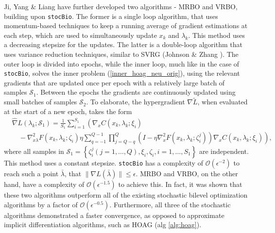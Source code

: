\documentclass[11pt, twoside]{report}
\begin{document}
Ji, Yang \& Liang have further developed two algorithms - MRBO and VRBO, building upon \texttt{stocBio}\cite{yang2021provably}. The former is a single loop algorithm, that uses momentum-based techniques to keep a running average of gradient estimations at each step, which are used to simultaneously update $x_k$ and $\lambda_k$. This method uses a decreasing stepsize for the updates. The latter is a double-loop algorithm that uses variance reduction techniques, similar to SVRG (Johnson \& Zhang \cite{johnson2013accelerating}). The outer loop is divided into epochs, while the inner loop, much like in the case of \texttt{stocBio}, solves the inner problem (\ref{inner_hoag_neu_orig}), using the relevant gradients that are updated once per epoch with a relatively large batch of samples $\mathcal{S}_1$. Between the epochs the gradients are continuously updated using small batches of samples $\mathcal{S}_2$. To elaborate, the hypergradient $\nabla \tilde{L}$, when evaluated at the start of a new epoch, takes the form
\begin{equation} \label{VRBO_hyper}
    \begin{aligned}
&\widehat{\nabla} L\left(\lambda_k ; \mathcal{S}_1\right)=\frac{1}{S_1} \sum_{i=1}^{S_1}\left(\nabla_x C\left(x_k, \lambda_k ; \xi_i\right)\right. \\
&\left.\quad-\nabla_{x \lambda}^2 F\left(x_k, \lambda_k ; \zeta_i\right) \eta \sum_{q=-1}^{Q-1} \prod_{j=Q-q}^Q\left(I-\eta \nabla_x^2 F\left(x_k, \lambda_k ; \zeta_i^j\right)\right) \nabla_x C\left(x_k, \lambda_k ; \xi_i\right)\right),
\end{aligned}
\end{equation}
where all samples in $\mathcal{S}_1 = \left\{\zeta_i^j(j=1, \ldots, Q), \xi_i, \zeta_i, i=1, \ldots, S_1\right\}$ are independent. This method uses a constant stepsize. \texttt{stocBio} has a complexity of $\mathcal{O}(\epsilon^{-2})$ to reach such a point $\bar{\lambda}$, that $\|\nabla L(\bar{\lambda})\| \leq \epsilon.$ MRBO and VRBO, on the other hand, have a complexity of $\mathcal{O}(\epsilon^{-1.5})$ to achieve this. In fact, it was shown that these two algorithms outperform all of the existing stochastic bilevel optimization algorithms by a factor of $\mathcal{O}(\epsilon^{-0.5})$. Furthermore, all three of the stochastic algorithms demonstrated a faster convergence, as opposed to approximate implicit differentiation algorithms, such as HOAG (alg \ref{alg:hoag}).  
\end{document}
